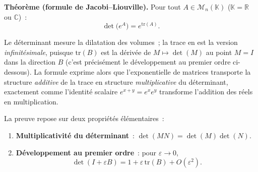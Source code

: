 ﻿%



\begin{tcolorbox}[thmbox]
  \textbf{Théorème (formule de Jacobi–Liouville).}%
  Pour tout $A \in \mathcal{M}_n(\mathbb{K})$ ($\mathbb{K} = \mathbb{R}$ ou $\mathbb{C}$)~:
  \[
    \boxed{\det\!\bigl(e^A\bigr) = e^{\mathrm{tr}(A)}}.
  \]
\end{tcolorbox}

\begin{significationintuitive}
Le déterminant mesure la dilatation des volumes~; la trace en est la version
\emph{infinitésimale}, puisque $\mathrm{tr}(B)$ est la dérivée de
$M \mapsto \det(M)$ au point $M = I$ dans la direction $B$ (c'est précisément le
développement au premier ordre ci-dessous). La formule exprime alors que
l'exponentielle de matrices transporte la structure \emph{additive} de la trace
en structure \emph{multiplicative} du déterminant, exactement comme l'identité
scalaire $e^{x+y} = e^x e^y$ transforme l'addition des réels en multiplication.
\end{significationintuitive}


\begin{mdframed}[style=exbar]
  La preuve repose sur deux propriétés élémentaires~:
  \begin{enumerate}
    \item \textbf{Multiplicativité du déterminant}~:
          $\det(MN) = \det(M)\det(N)$.
    \item \textbf{Développement au premier ordre}~:
          pour $\varepsilon \to 0$,
          \[
            \det(I + \varepsilon B) = 1 + \varepsilon\,\mathrm{tr}(B) + O(\varepsilon^2).
          \]
  \end{enumerate}
\end{mdframed}


